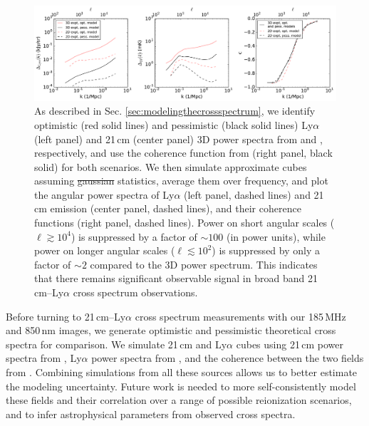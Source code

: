 \documentclass[numberedappendix]{emulateapj}
\providecommand{\DIFadd}[1]{{\protect\color{blue}\uwave{#1}}} %
\providecommand{\DIFdel}[1]{{\protect\color{red}\sout{#1}}}                      %
\providecommand{\DIFaddFL}[1]{\DIFadd{#1}} %
\providecommand{\DIFdelFL}[1]{\DIFdel{#1}} %
\providecommand{\DIFaddbeginFL}{} %
\providecommand{\DIFaddendFL}{} %
\providecommand{\DIFdelbeginFL}{} %
\providecommand{\DIFdelendFL}{} %
\begin{document}
\begin{figure}[h]
\centering
\DIFdelbeginFL %
\DIFdelendFL \DIFaddbeginFL \includegraphics[width=7in]{chap5_xcor/spectra3D_to_2D.pdf}
\DIFaddendFL \caption[Study of the relationship between power spectra recovered from 2D and 3D surveys, both for 21\,cm and 850\,nm cubes.]{As described in Sec. \ref{sec:modelingthecrossspectrum}, we identify optimistic (red solid lines) and pessimistic (black solid lines) Ly$\alpha$ (left panel) and 21\,cm (center panel) 3D power spectra from \citet{Gong2014} and \DIFdelbeginFL %
\DIFdelendFL \DIFaddbeginFL \citet{PoberNextGen, 21cmfast}\DIFaddendFL , respectively, and use the coherence function from \citet{Heneka2016} (right panel, black solid) for both scenarios. We then simulate approximate cubes assuming \DIFdelbeginFL \DIFdelFL{gaussian }\DIFdelendFL \DIFaddbeginFL \DIFaddFL{Gaussian }\DIFaddendFL statistics, average them over frequency, and plot the angular power spectra of Ly$\alpha$ (left panel, dashed lines) and 21\,cm emission (center panel, dashed lines), and their coherence functions (right panel, dashed lines). Power on short angular scales ($\ell\gtrsim10^4$) is suppressed by a factor of $\sim100$ (in power units), while power on longer angular scales ($\ell\lesssim10^2$) is suppressed by only a factor of $\sim2$ compared to the 3D power spectrum. This indicates that there remains significant observable signal in broad band 21\,cm--Ly$\alpha$ cross spectrum observations. }
\label{fig:spectra3Dto2D}
\end{figure}

Before turning to 21\,cm--Ly$\alpha$ cross spectrum measurements with our 185\,MHz and 850\,nm images, we generate optimistic and pessimistic theoretical cross spectra for comparison. We simulate 21\,cm and Ly$\alpha$ cubes using 21\,cm power spectra from \citet{PoberNextGen}, Ly$\alpha$ power spectra from \citet{Gong2014}, and the coherence between the two fields from \citet{Heneka2016}. Combining simulations from all these sources allows us to better estimate the modeling uncertainty. Future work is needed to more self-consistently model these fields and their correlation over a range of possible reionization scenarios, and to infer astrophysical parameters from observed cross spectra.
\end{document}
